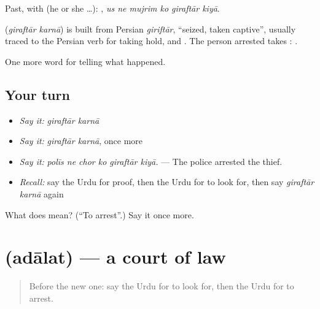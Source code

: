 Past, with  (he or she …):      , \emph{us ne mujrim ko giraftār kiyā}.

\begin{cousinweb}
\textbf{ } (\emph{giraftār karnā}) is built from Persian \emph{giriftār}, \textquotedblleft{}seized, taken captive\textquotedblright{}, usually traced to the Persian verb for taking hold, and \textbf{}. The person arrested takes \textbf{}: \textbf{   }.
\end{cousinweb}

\begin{grammarlens}[title={What you've built}]
One more word for telling what happened.
\end{grammarlens}

\subsection*{Your turn}
\begin{itemize}
\raggedright
  \item \emph{Say it:} \emph{giraftār karnā}
  \item \emph{Say it:} \emph{giraftār karnā}, once more
  \item \emph{Say it:} \emph{polīs ne chor ko giraftār kiyā.} — The police arrested the thief.
  \item \emph{Recall:} say the Urdu for proof, then the Urdu for to look for, then say \emph{giraftār karnā} again
\end{itemize}

\begin{tcolorbox}[breakable,colback=teal!4,colframe=teal!35!black,title={Before you move on}]
What does   mean? (\textquotedblleft{}To arrest\textquotedblright{}.) Say it once more.
\end{tcolorbox}
\section[\texorpdfstring{\ur{عدالت} (adālat)}{عدالت (adālat)}]{ (adālat) — a court of law}

\label{lesson:UR-C283-adalat}



\begin{quote}
Before the new one: say the Urdu for to look for, then the Urdu for to arrest.
\end{quote}

